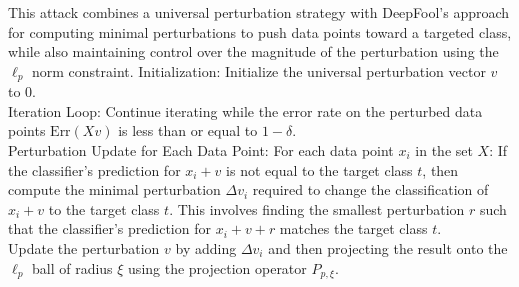 This attack combines a universal perturbation strategy with DeepFool's approach for computing minimal perturbations to push data points toward a targeted class, while also maintaining control over the magnitude of the perturbation using the $\ell_p$ norm constraint.
Initialization: Initialize the universal perturbation vector $ v $ to 0. \\
Iteration Loop: Continue iterating while the error rate on the perturbed data points $ \text{Err}(Xv) $ is less than or equal to $ 1 - \delta $. \\
Perturbation Update for Each Data Point: For each data point $ x_i $ in the set $ X $:
 If the classifier's prediction for $ x_i + v $ is not equal to the target class $ t $, then compute the minimal perturbation $ \Delta v_i $ required to change the classification of $ x_i + v $ to the target class $ t $. This involves finding the smallest perturbation $ r $ such that the classifier's prediction for $ x_i + v + r $ matches the target class $ t $. \\
Update the perturbation $ v $ by adding $ \Delta v_i $ and then projecting the result onto the $\ell_p$ ball of radius $ \xi $ using the projection operator $ P_{p, \xi} $.
